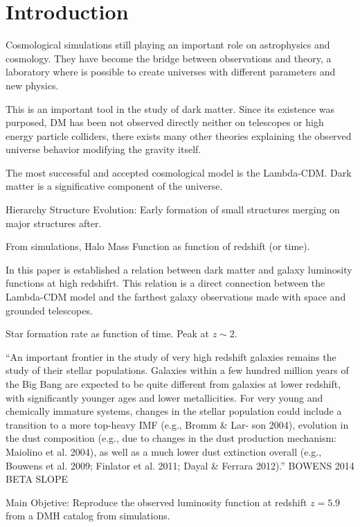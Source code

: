 \section{Introduction}
Cosmological simulations still playing an important role on astrophysics and
cosmology. They have become the bridge between observations and theory, a
laboratory where is possible to create universes with different parameters and
new physics.

This is an important tool in the study of dark matter. Since its existence was
purposed, DM has been not observed directly neither on telescopes or high energy
particle colliders, there exists many other theories explaining the observed
universe behavior modifying the gravity itself.

The most successful and accepted cosmological model is the Lambda-CDM. 
Dark matter is a significative component of the universe.
\citep{trimble87}

Hierarchy Structure Evolution: Early formation of small structures
merging on major structures after.

From simulations, Halo Mass Function as function of redshift (or time).


In this paper is established a relation between dark matter and galaxy
luminosity functions at high redshifrt. This relation is a direct
connection between the Lambda-CDM model and the farthest galaxy observations
made with space and grounded telescopes.


Star formation rate as function of time. Peak at $z\sim 2$.


``An important frontier in the study of very high redshift
galaxies remains the study of their stellar populations.
Galaxies within a few hundred million years of the Big
Bang are expected to be quite different from galaxies at
lower redshift, with significantly younger ages and lower
metallicities. For very young and chemically immature
systems, changes in the stellar population could include a
transition to a more top-heavy IMF (e.g., Bromm \& Lar-
son 2004), evolution in the dust composition (e.g., due to
changes in the dust production mechanism: Maiolino et
al. 2004), as well as a much lower dust extinction overall
(e.g., Bouwens et al. 2009; Finlator et al. 2011; Dayal \&
Ferrara 2012).'' BOWENS 2014 BETA SLOPE




Main Objetive: Reproduce the observed luminosity function at redshift $z=5.9$
from a DMH catalog from simulations. 

